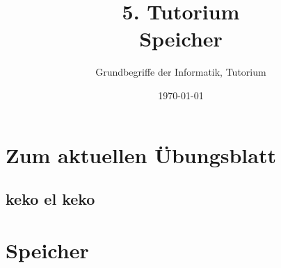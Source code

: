 




\title[Speicher]{5. Tutorium\\ Speicher}
\subtitle{Grundbegriffe der Informatik, Tutorium \hashtag\mytutnumber}
\date{\today}




\titleframe
\roadmap

\section[Aktuell]{Zum aktuellen Übungsblatt}
\subsection{keko el keko}



\section{Speicher}




\section{}
\questionframe
\lastframe
{}
